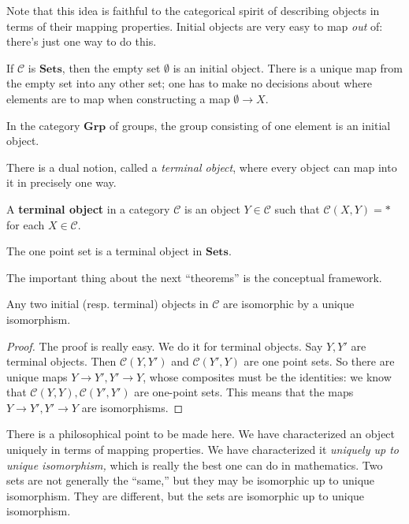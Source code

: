 Note that this idea is faithful to the categorical spirit of describing objects
in terms of their mapping properties. Initial objects are very easy to map
\emph{out} of: there's just one way to do this.


\begin{example}
If $\mathcal{C}$ is $\mathbf{Sets}$, then the empty set $\emptyset$ is an
initial object. There is a unique map from the empty set into any other set;
one has to make no decisions about where elements are to map when
constructing a map $\emptyset \to X$.
\end{example}

\begin{example} 
In the category $\mathbf{Grp}$ of groups, the group consisting of one element
is an initial object.
\end{example} 



There is a dual notion, called a \textit{terminal object}, where every object
can map into it in precisely one way.
\begin{definition}
A \textbf{terminal object} in a category $\mathcal{C}$ is an object $Y \in
\mathcal{C}$ such that $\mathcal{C}(X, Y) = \ast$ for each $X \in \mathcal{C}$.
\end{definition}

\begin{example}
The one point set is a terminal object in $\mathbf{Sets}$.
\end{example}

The important thing about the next ``theorems'' is the conceptual framework.
\begin{theorem}
Any two initial (resp. terminal) objects in $\mathcal{C}$ are isomorphic by a
unique isomorphism.
\end{theorem}
\begin{proof}
The proof is really easy. We do it for terminal objects. Say $Y, Y'$ are
terminal objects. Then $\mathcal{C}(Y, Y')$ and $\mathcal{C}(Y', Y)$ are one
point sets. So there are unique maps $Y \to Y', Y' \to Y$, whose composites
must be the identities: we know that $\mathcal{C}(Y, Y) , \mathcal{C}(Y', Y')$
are one-point sets. This means that the maps $Y \to Y', Y' \to Y$ are
isomorphisms.
\end{proof}

There is a philosophical point to be made here. We have characterized an object
uniquely in terms of mapping properties. We have characterized it
\emph{uniquely up to unique isomorphism,} which is really the best one can do
in mathematics. Two sets are not generally the ``same,'' but they may be
isomorphic up to unique isomorphism. They are different,
but the sets are isomorphic up
to unique isomorphism.

